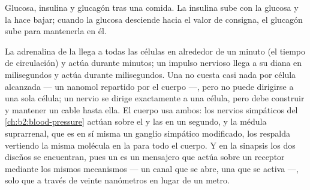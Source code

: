 \begin{omfigure}

{\small Glucosa, insulina y glucagón tras una comida. La insulina sube con
la glucosa y la hace bajar; cuando la glucosa desciende hacia el valor de
consigna, el glucagón sube para mantenerla en él.}
\end{omfigure}

\begin{example}\label{ex:b2:cell-signalling:compare}
La adrenalina de la  llega a todas las células en alrededor de un
minuto (el tiempo de circulación) y actúa durante minutos; un impulso
nervioso llega a su diana en milisegundos y actúa durante milisegundos.
Una  no cuesta casi nada por célula alcanzada --- un nanomol
repartido por el cuerpo ---, pero no puede dirigirse a una sola célula; un
nervio se dirige exactamente a una célula, pero debe construir y mantener
un cable hasta ella. El cuerpo usa ambos: los nervios simpáticos del
\cref{ch:b2:blood-pressure} actúan sobre el  y las  en
un segundo, y la médula suprarrenal, que es en sí misma un ganglio
simpático modificado, los respalda vertiendo la misma molécula en la
 para todo el cuerpo. Y en la sinapsis los dos diseños se
encuentran, pues un  es un mensajero que actúa sobre un
receptor mediante los mismos mecanismos --- un canal que se abre, una
 que se activa ---, solo que a través de veinte nanómetros en
lugar de un metro.
\end{example}

